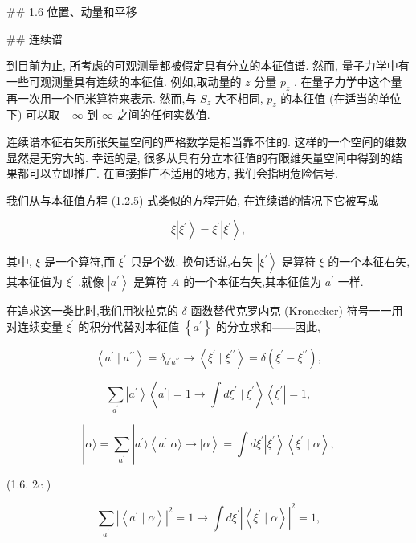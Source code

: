 \documentclass[lang=cn,newtx,10pt,scheme=chinese,thmcnt=section]{elegantbook}
\begin{document}
## 1.6 位置、动量和平移

## 连续谱

到目前为止, 所考虑的可观测量都被假定具有分立的本征值谱. 然而, 量子力学中有一些可观测量具有连续的本征值. 例如,取动量的 $z$ 分量 ${p}_{z}$ . 在量子力学中这个量再一次用一个厄米算符来表示. 然而,与 ${S}_{z}$ 大不相同, ${p}_{z}$ 的本征值 (在适当的单位下) 可以取 $- \infty$ 到 $\infty$ 之间的任何实数值.

连续谱本征右矢所张矢量空间的严格数学是相当靠不住的. 这样的一个空间的维数显然是无穷大的. 幸运的是, 很多从具有分立本征值的有限维矢量空间中得到的结果都可以立即推广. 在直接推广不适用的地方, 我们会指明危险信号.

我们从与本征值方程 (1.2.5) 式类似的方程开始, 在连续谱的情况下它被写成

$$
\xi \left| {\xi }^{\prime }\right\rangle = {\xi }^{\prime }\left| {\xi }^{\prime }\right\rangle , \tag{1.6.1}
$$

其中, $\xi$ 是一个算符,而 ${\xi }^{\prime }$ 只是个数. 换句话说,右矢 $\left| {\xi }^{\prime }\right\rangle$ 是算符 $\xi$ 的一个本征右矢,其本征值为 ${\xi }^{\prime }$ ,就像 $\left| {a}^{\prime }\right\rangle$ 是算符 $A$ 的一个本征右矢,其本征值为 ${a}^{\prime }$ 一样.

在追求这一类比时,我们用狄拉克的 $\delta$ 函数替代克罗内克 (Kronecker) 符号一一用对连续变量 ${\xi }^{\prime }$ 的积分代替对本征值 $\left\{ {a}^{\prime }\right\}$ 的分立求和——因此,

$$
\left\langle {{a}^{\prime } \mid {a}^{\prime \prime }}\right\rangle = {\delta }_{{a}^{\prime }{a}^{\prime \prime }} \rightarrow \left\langle {{\xi }^{\prime } \mid {\xi }^{\prime \prime }}\right\rangle = \delta \left( {{\xi }^{\prime } - {\xi }^{\prime \prime }}\right) , \tag{1.6.2a}
$$

$$
\mathop{\sum }\limits_{{a}^{\prime }}\left| {a}^{\prime }\right\rangle \left\langle {{a}^{\prime } \mid = 1 \rightarrow \int d{\xi }^{\prime } \mid {\xi }^{\prime }}\right\rangle \left\langle {\xi }^{\prime }\right| = 1, \tag{1.6.2b}
$$

$$
\left| {\alpha \rangle = \mathop{\sum }\limits_{{a}^{\prime }}}\right| {a}^{\prime }\rangle \left\langle {{a}^{\prime }\left| {\alpha \rangle \rightarrow }\right| \alpha }\right\rangle = \int d{\xi }^{\prime }\left| {\xi }^{\prime }\right\rangle \left\langle {{\xi }^{\prime } \mid \alpha }\right\rangle ,
$$

(1.6. $2\mathrm{c}$ )

$$
\mathop{\sum }\limits_{{a}^{\prime }}{\left| \left\langle {a}^{\prime } \mid \alpha \right\rangle \right| }^{2} = 1 \rightarrow \int d{\xi }^{\prime }{\left| \left\langle {\xi }^{\prime } \mid \alpha \right\rangle \right| }^{2} = 1, \tag{1.6.2d}
$$
\end{document}
